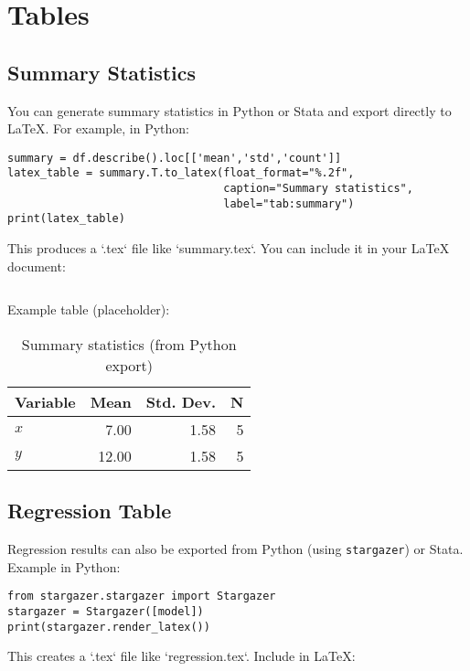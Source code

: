 \section{Tables}
\subsection{Summary Statistics}
You can generate summary statistics in Python or Stata and export directly to LaTeX.  
For example, in Python:

\begin{lstlisting}
summary = df.describe().loc[['mean','std','count']]
latex_table = summary.T.to_latex(float_format="%.2f",
                                 caption="Summary statistics",
                                 label="tab:summary")
print(latex_table)
\end{lstlisting}

This produces a `.tex` file like `summary.tex`. You can include it in your LaTeX document:

\begin{verbatim}

\end{verbatim}

Example table (placeholder):

\begin{table}[h!]
\centering
\begin{tabular}{lrrr}
\toprule
Variable & Mean & Std. Dev. & N \\
\midrule
$x$ & 7.00 & 1.58 & 5 \\
$y$ & 12.00 & 1.58 & 5 \\
\bottomrule
\end{tabular}
\caption{Summary statistics (from Python export)}
\label{tab:summary}
\end{table}

\subsection{Regression Table}
Regression results can also be exported from Python (using \texttt{stargazer}) or Stata.  
Example in Python:

\begin{lstlisting}
from stargazer.stargazer import Stargazer
stargazer = Stargazer([model])
print(stargazer.render_latex())
\end{lstlisting}

This creates a `.tex` file like `regression.tex`. Include in LaTeX:

\begin{verbatim}

\end{verbatim}

